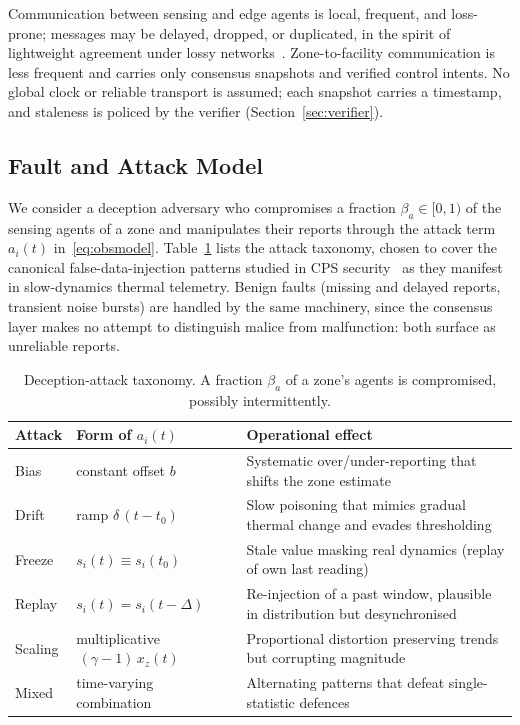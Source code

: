 \documentclass[preprint,11pt]{elsarticle}
\begin{document}
Communication between sensing and edge agents is local, frequent, and
loss-prone; messages may be delayed, dropped, or duplicated, in the
spirit of lightweight agreement under lossy
networks~\cite{zhang2021approx}. Zone-to-facility communication is less
frequent and carries only consensus snapshots and verified control
intents. No global clock or reliable transport is assumed; each
snapshot carries a timestamp, and staleness is policed by the verifier
(Section~\ref{sec:verifier}).

\subsection{Fault and Attack Model}
\label{sec:faultmodel}

We consider a deception adversary who compromises a fraction
$\beta_a\in[0,1)$ of the sensing agents of a zone and manipulates their
reports through the attack term $a_i(t)$
in~\eqref{eq:obsmodel}. Table~\ref{tab:attacks} lists the attack
taxonomy, chosen to cover the canonical false-data-injection patterns
studied in CPS security~\cite{padhan2022} as they manifest in
slow-dynamics thermal telemetry. Benign faults (missing and delayed
reports, transient noise bursts) are handled by the same machinery,
since the consensus layer makes no attempt to distinguish malice from
malfunction: both surface as unreliable reports.

\begin{table}[!tbp]
\centering
\caption{Deception-attack taxonomy. A fraction $\beta_a$ of a zone's
agents is compromised, possibly intermittently.}
\label{tab:attacks}
\footnotesize
\begin{tabular}{llp{}}
\toprule
\textbf{Attack} & \textbf{Form of $a_i(t)$} & \textbf{Operational
effect} \\
\midrule
Bias & constant offset $b$ & Systematic over/under-reporting that
shifts the zone estimate \\
Drift & ramp $\delta\,(t-t_0)$ & Slow poisoning that mimics gradual
thermal change and evades thresholding \\
Freeze & $s_i(t)\equiv s_i(t_0)$ & Stale value masking real dynamics
(replay of own last reading) \\
Replay & $s_i(t)=s_i(t-\Delta)$ & Re-injection of a past window,
plausible in distribution but desynchronised \\
Scaling & multiplicative $\,(\gamma-1)\,x_z(t)$ & Proportional
distortion preserving trends but corrupting magnitude \\
Mixed & time-varying combination & Alternating patterns that defeat
single-statistic defences \\
\bottomrule
\end{tabular}
\end{table}
\end{document}
